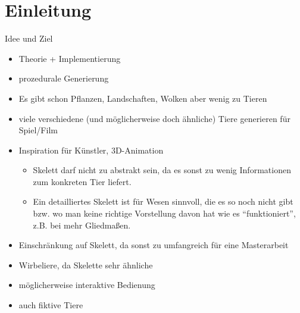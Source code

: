 \chapter{Einleitung}

Idee und Ziel

\begin{itemize}
 \item Theorie + Implementierung
 \item prozedurale Generierung
 \item Es gibt schon Pflanzen, Landschaften, Wolken \etc aber wenig zu Tieren
 \item viele verschiedene (und möglicherweise doch ähnliche) Tiere generieren für Spiel/Film
 \item Inspiration für Künstler, 3D-Animation
    \begin{itemize}
     \item Skelett darf nicht zu abstrakt sein, da es sonst zu wenig Informationen zum konkreten Tier liefert.
     \item Ein detailliertes Skelett ist für Wesen sinnvoll, die es so noch nicht gibt bzw. wo man keine richtige Vorstellung davon hat wie es "`funktioniert"', z.B. bei mehr Gliedmaßen.
    \end{itemize}
 \item Einschränkung auf Skelett, da sonst zu umfangreich für eine Masterarbeit
 \item Wirbeliere, da Skelette sehr ähnliche
 \item möglicherweise interaktive Bedienung
 \item auch fiktive Tiere
\end{itemize}


